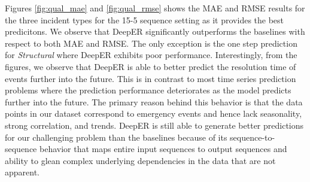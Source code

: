 Figures \ref{fig:qual_mae} and \ref{fig:qual_rmse} shows the MAE and RMSE results for the three incident types for the 15-5 sequence setting as it provides the best predicitons. We observe that DeepER significantly outperforms the baselines with respect to both MAE and RMSE. The only exception is the one step prediction for \textit{Structural} where DeepER exhibits poor performance. Interestingly, from the figures, we observe that DeepER  is able to better predict  the resolution time of events further into the future. This is in contrast to most time series prediction problems where the prediction performance deteriorates as the model predicts further into the future. The primary reason behind this behavior is that the data points in our dataset correspond to emergency events and hence lack seasonality, strong correlation, and trends. DeepER is still able to generate better predictions for our challenging problem than the baselines because of its sequence-to-sequence behavior that maps entire input sequences to output sequences and ability to glean complex underlying dependencies in the data that are not apparent. 





